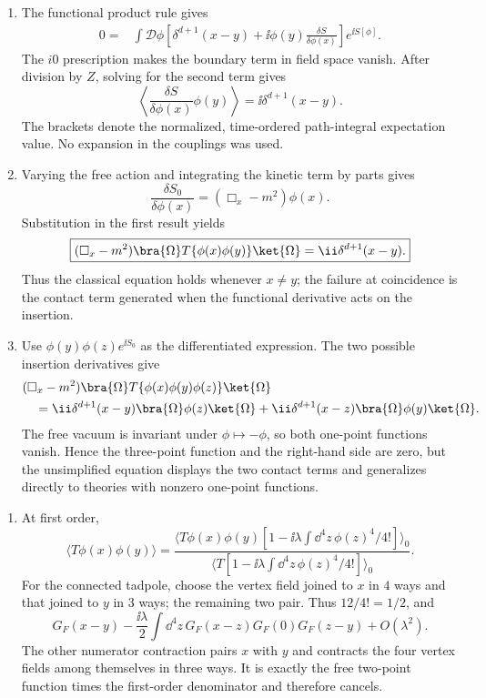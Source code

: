 \begin{enumerate}
\begin{enumerate}
\item
The functional product rule gives
\[
 \begin{split}
 0={}&\int\mathcal D\phi\left[
 \delta^{d+1}(x-y)
 +\ii\phi(y)\frac{\delta S}{\delta\phi(x)}
 \right]e^{\ii S[\phi]}.
 \end{split}
\]
The \(i0\) prescription makes the boundary term in field space vanish.
After division by \(Z\), solving for the second term gives
\[
 \boxed{
 \left\langle\frac{\delta S}{\delta\phi(x)}\phi(y)\right\rangle
 =\ii\delta^{d+1}(x-y).}
\]
The brackets denote the normalized, time-ordered path-integral
expectation value.  No expansion in the couplings was used.
\item
Varying the free action and integrating the kinetic term by parts gives
\[
 \frac{\delta S_0}{\delta\phi(x)}
 =(\Box_x-m^2)\phi(x).
\]
Substitution in the first result yields
\[
 \boxed{
 (\Box_x-m^2)
 \bra{\Omega}T\{\phi(x)\phi(y)\}\ket{\Omega}
 =\ii\delta^{d+1}(x-y).}
\]
Thus the classical equation holds whenever \(x\ne y\); the failure at
coincidence is the contact term generated when the functional derivative
acts on the insertion.
\item
Use \(\phi(y)\phi(z)e^{\ii S_0}\) as the differentiated expression.  The two
possible insertion derivatives give
\[
 \begin{split}
 &(\Box_x-m^2)
 \bra{\Omega}T\{\phi(x)\phi(y)\phi(z)\}\ket{\Omega}\\
 &\quad=\ii\delta^{d+1}(x-y)\bra{\Omega}\phi(z)\ket{\Omega}
 +\ii\delta^{d+1}(x-z)\bra{\Omega}\phi(y)\ket{\Omega}.
 \end{split}
\]
The free vacuum is invariant under \(\phi\mapsto-\phi\), so both
one-point functions vanish.  Hence the three-point function and the
right-hand side are zero, but the unsimplified equation displays the two
contact terms and generalizes directly to theories with nonzero one-point
functions.
\end{enumerate}

\begin{enumerate}
\item
At first order,
\[
 \langle T\phi(x)\phi(y)\rangle
 =\frac{\langle T\phi(x)\phi(y)
 [1-\ii\lambda\int \dd^4z\,\phi(z)^4/4!]\rangle_0}
 {\langle T[1-\ii\lambda\int \dd^4z\,\phi(z)^4/4!]\rangle_0}.
\]
For the connected tadpole, choose the vertex field joined to \(x\) in
\(4\) ways and that joined to \(y\) in \(3\) ways; the remaining two pair.
Thus \(12/4!=1/2\), and
\[
 G_F(x-y)-\frac{\ii\lambda}{2}\int \dd^4z\,
 G_F(x-z)G_F(0)G_F(z-y)+O(\lambda^2).
\]
The other numerator contraction pairs \(x\) with \(y\) and contracts the
four vertex fields among themselves in three ways.  It is exactly the
free two-point function times the first-order denominator and therefore
cancels.


\end{enumerate}
\end{enumerate}
